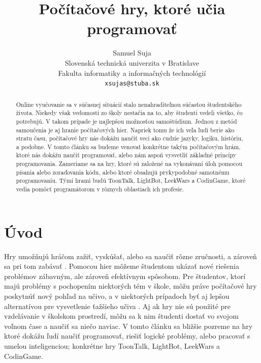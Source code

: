 \documentclass[slovak,a4paper,10pt]{article}
\title{Počítačové hry, ktoré učia programovať}
\author{Samuel Suja\\
	{\small Slovenská technická univerzita v Bratislave}\\
	{\small Fakulta informatiky a informačných technológií}\\
	{\small \texttt{xsujas@stuba.sk}}
	}
\date{}
\begin{document}
\maketitle

\begin{abstract}

Online vyučovanie sa v súčasnej situácií stalo nenahraditeľnou súčasťou študentského života. Niekedy však vedomosti zo školy nestačia na to, aby študenti vedeli všetko, čo potrebujú. V takom prípade je najlepšou možnosťou samoštúdium. Jednou z metód samoučenia je aj hranie počítačových hier. Napriek tomu že ich veľa ľudí berie ako stratu času, počítačové hry nás dokážu naučiť veci ako cudzie jazyky, logiku, históriu, a podobne. V tomto článku sa budeme venovať konkrétne takým počítačovým hrám, ktoré nás dokážu naučiť programovať, alebo nám aspoň vysvetliť základné princípy programovania. Zameriame sa na hry, ktoré sú založené na vykonávaní úloh pomocou písania alebo zoraďovania kódu, alebo ktoré obsahujú prvkypodobné samotnému programovaniu. Tými hrami budú ToonTalk, LightBot, LeekWars a CodinGame, ktoré vedia pomôcť programátorom v rôznych oblastiach ich profesie.

\end{abstract}

\section{Úvod}

Hry umožňujú hráčom zažiť, vyskúšať, alebo sa naučiť rôzne zručnosti, a zároveň sa pri tom zabávať \cite{burgos2007re}. Pomocou hier môžeme študentom ukázať nové riešenia problémov zábavným, ale zároveň efektívnym spôsobom. Pre študentov, ktorí majú problémy s pochopením niektorých tém v škole, môžu práve počítačové hry poskytnúť nový pohľad na učivo, a v niektorých prípadoch byť aj lepšou alternatívou pre vysvetlenie ťažšieho učiva \cite{seng2014computer}. Aj ak hry nie sú použité pre vzdelávanie v školskom prostredí, môžu sa k nim študenti dostať vo svojom voľnom čase a naučiť sa niečo naviac. V tomto článku sa bližšie pozreme na hry ktoré dokážu ľudí naučiť programovať, riešiť logické problémy, alebo pracovať s umelou inteligenciou; konkrétne hry ToonTalk, LightBot, LeekWars a CodinGame.

\end{document}
